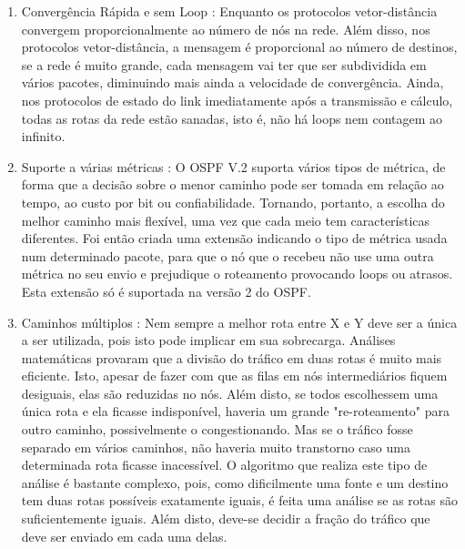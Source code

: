 \documentclass[12pt,a4paper]{report}
\begin{document}
\begin{enumerate}
\item Converg\^encia R\'apida e sem Loop : Enquanto os protocolos vetor-dist\^ancia convergem proporcionalmente ao n\'umero de n\'os na rede. Al\'em disso, nos protocolos vetor-dist\^ancia, a mensagem \'e proporcional ao n\'umero de destinos, se a rede \'e muito grande, cada mensagem vai ter que ser subdividida em v\'arios pacotes, diminuindo mais ainda a velocidade de converg\^encia. Ainda, nos protocolos de estado do link imediatamente ap\'os a transmiss\~ao e c\'alculo, todas as rotas da rede est\~ao sanadas, isto \'e, n\~ao h\'a loops nem contagem ao infinito.
\item Suporte a v\'arias m\'etricas : O OSPF V.2 suporta v\'arios tipos de m\'etrica, de forma que a decis\~ao sobre o menor caminho pode ser tomada em rela\c{c}\~ao ao tempo, ao custo por bit ou confiabilidade. Tornando, portanto, a escolha do melhor caminho mais flex\'ivel, uma vez que cada meio tem caracter\'isticas diferentes. Foi ent\~ao criada uma extens\~ao indicando o tipo de m\'etrica usada num determinado pacote, para que o n\'o que o recebeu n\~ao use uma outra m\'etrica no seu envio e prejudique o roteamento provocando loops ou atrasos. Esta extens\~ao s\'o \'e suportada na vers\~ao 2 do OSPF.
\item Caminhos m\'ultiplos : Nem sempre a melhor rota entre X e Y deve ser a \'unica a ser utilizada, pois isto pode implicar em sua sobrecarga. An\'alises matem\'aticas provaram que a divis\~ao do tr\'afico em duas rotas \'e muito mais eficiente. Isto, apesar de fazer com que as filas em n\'os intermedi\'arios fiquem desiguais, elas s\~ao reduzidas no n\'os. Al\'em disto, se todos escolhessem uma \'unica rota e ela ficasse indispon\'ivel, haveria um grande "re-roteamento" para outro caminho, possivelmente o congestionando. Mas se o tr\'afico fosse separado em v\'arios caminhos, n\~ao haveria muito transtorno caso uma determinada rota ficasse inacess\'ivel. O algoritmo que realiza este tipo de análise \'e bastante complexo, pois, como dificilmente uma fonte e um destino tem duas rotas poss\'iveis exatamente iguais, \'e feita uma an\'alise se as rotas s\~ao suficientemente iguais. Al\'em disto, deve-se decidir a fra\c{c}\~ao do tr\'afico que deve ser enviado em cada uma delas.
\end{enumerate}
\end{document}
